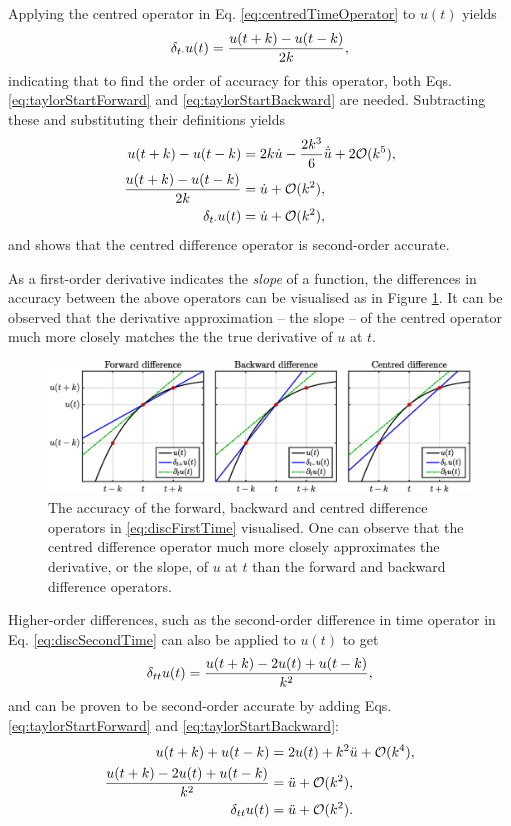 Applying the centred operator in Eq. \eqref{eq:centredTimeOperator} to $u(t)$ yields
\begin{equation}
    \delta_{t\cdot} u(t) = \frac{u(t+k) - u(t-k)}{2k},
\end{equation}
indicating that to find the order of accuracy for this operator, both Eqs. \eqref{eq:taylorStartForward} and \eqref{eq:taylorStartBackward} are needed. Subtracting these and substituting their definitions yields
\begin{align}
    u(t+k) - u(t-k) &= 2k\dot u - \frac{2k^3}{6}\dot{\ddot{u}} + 2\mathcal{O}(k^5),\nonumber\\
    \frac{u(t+k) - u(t-k)}{2k} &= \dot u + \mathcal{O}(k^2),\nonumber\\
    \delta_{t\cdot} u(t) &= \dot u + \mathcal{O}(k^2),
\end{align}
and shows that the centred difference operator is second-order accurate. 

As a first-order derivative indicates the \textit{slope} of a function, the differences in accuracy between the above operators can be visualised as in Figure \ref{fig:taylor}. It can be observed that the derivative approximation -- the slope -- of the centred operator much more closely matches the the true derivative of $u$ at $t$.

\begin{figure}[h]
    \includegraphics[width=\textwidth]{figures/fdtd/taylor.eps}
    \caption{\label{fig:taylor} The accuracy of the forward, backward and centred difference operators in \eqref{eq:discFirstTime} visualised. One can observe that the centred difference operator much more closely approximates the derivative, or the slope, of $u$ at $t$ than the forward and backward difference operators.}
\end{figure}

Higher-order differences, such as the second-order difference in time operator in Eq. \eqref{eq:discSecondTime} can also be applied to $u(t)$ to get
\begin{equation}
    \delta_{tt} u(t) =  \frac{u(t+k) - 2u(t) + u(t-k)}{k^2},
\end{equation}
and can be proven to be second-order accurate by adding Eqs. \eqref{eq:taylorStartForward} and \eqref{eq:taylorStartBackward}:
\begin{align}
    u(t+k) + u(t-k) &= 2 u(t) + k^2 \ddot u + \mathcal{O}(k^4),\nonumber\\
    \frac{u(t+k) -2 u(t) + u(t-k)}{k^2} &= \ddot u + \mathcal{O}(k^2),\nonumber\\
    \delta_{tt} u(t) &= \ddot u + \mathcal{O}(k^2).
\end{align}

